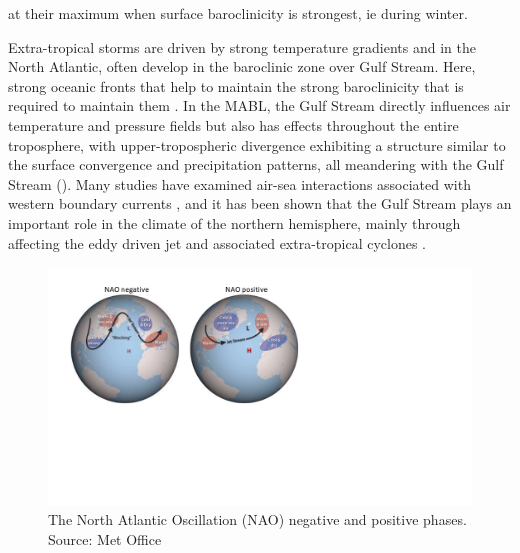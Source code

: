 at their maximum when surface baroclinicity is strongest, ie during winter.

Extra-tropical storms are driven by strong temperature gradients and in the North Atlantic, often develop in the baroclinic zone over Gulf Stream. Here, strong oceanic fronts that help to maintain the strong baroclinicity that is required to maintain them \citep{nakamura2004observed, nakamura2008importance, hoskins1990existence}. In the MABL, the Gulf Stream directly influences air temperature and pressure fields but also has effects throughout the entire troposphere, with upper-tropospheric divergence exhibiting a structure similar to the surface convergence and precipitation patterns, all meandering with the Gulf Stream (\citep{minobe2008influence}). Many studies have examined air-sea interactions associated with western boundary currents  \citep{ma2015distant, shaman2010air, kwon2010role, czaja2001observations, czaja2002observed, minobe2008influence, smirnov2015investigating, kelly2010western, cayan1992latent}, and it has been shown that the Gulf Stream plays an important role in the climate of the northern hemisphere, mainly through affecting the eddy driven jet and associated extra-tropical cyclones \citep{sampe2010significance, nakamura2008importance, booth2012sensitivity, small2014storm, woollings2012response, vanniere2017contribution, vanniere2017cold}. 

\begin{figure}[h]
	\centering
	\noindent\includegraphics[width=44pc,angle=0]{NAO_all_MO.png}
	\caption{The North Atlantic Oscillation (NAO) negative and positive phases. Source: Met Office }\label{fig:NAO}
\end{figure}


